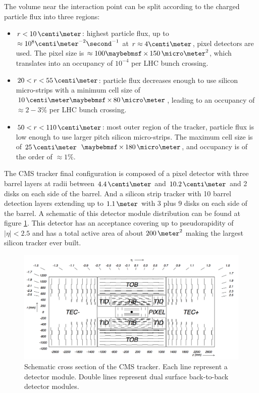 The volume near the interaction point can be split according to the charged particle flux into three regions:

\begin{itemize}
  \item $r<10\,\centi\meter$: highest particle flux, up to $\approx 10^8 \centi\meter^{-2}\second^{-1}$ at $r \approx 4 \centi\meter$, pixel detectors are used. The pixel size is $\approx 100 \times 150\,\micro\meter^2$, which translates into an occupancy of $10^{-4}$ per \gls{LHC} bunch crossing.
  \item $20<r<55\,\centi\meter$: particle flux decreases enough to use silicon micro-strips with a minimum cell size of $10\,\centi\meter \times 80\,\micro\meter$, leading to an occupancy of $\approx 2-3\%$ per \gls{LHC} bunch crossing.
  \item $50<r<110\,\centi\meter$: most outer region of the tracker, particle flux is low enough to use larger pitch silicon micro-strips. The maximum cell size is of $25\,\centi\meter$ $\times 180\,\micro\meter$, and occupancy is of the order of $\approx 1\%$.
\end{itemize}

The \gls{CMS} tracker final configuration is composed of a pixel detector with three barrel layers at radii between $4.4\,\centi\meter$ and $10.2\,\centi\meter$ and 2 disks on each side of the barrel. And a silicon strip tracker with 10 barrel detection layers extending up to $1.1\,\meter$ with 3 plus 9 disks on each side of the barrel. A schematic of this detector module distribution can be found at figure \ref{FIGURE:ExperimentalApparatus_CMS_Tracker_Layout}. This detector has an acceptance covering up to pseudorapidity of $|\eta|<2.5$ and has a total active area of about $200\,\meter^2$ making the largest silicon tracker ever built. 

\begin{figure}[!htb]
  \centering
  \includegraphics[width=1.0\textwidth]{Chapter02/CMS/Images/CMS_Tracker_Layout.png}
  \caption{Schematic cross section of the CMS tracker. Each line represent a detector module. Double lines represent dual surface back-to-back detector modules.}
  \label{FIGURE:ExperimentalApparatus_CMS_Tracker_Layout}
\end{figure}

